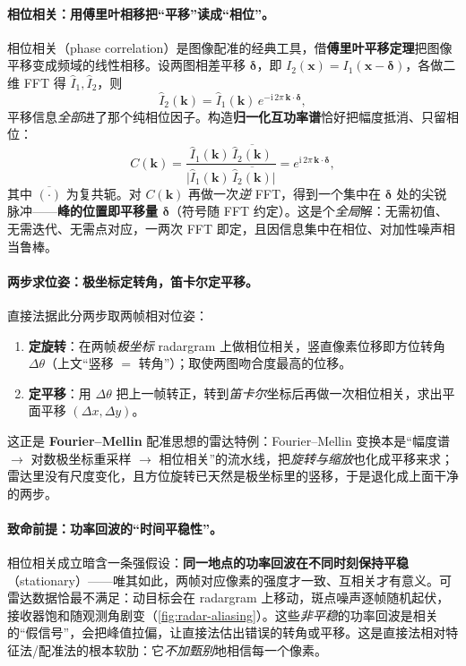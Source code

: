 \paragraph{相位相关：用傅里叶相移把“平移”读成“相位”。}
相位相关（phase correlation）是图像配准的经典工具，借\textbf{傅里叶平移定理}把图像平移变成频域的线性相移。设两图相差平移 $\boldsymbol\delta$，即 $I_2(\mathbf x)=I_1(\mathbf x-\boldsymbol\delta)$，各做二维 FFT 得 $\hat I_1,\hat I_2$，则
\begin{equation}
  \hat I_2(\mathbf k)=\hat I_1(\mathbf k)\,e^{-\mathrm{i}\,2\pi\,\mathbf k\cdot\boldsymbol\delta},
  \label{eq:radar-phasecorr-shift}
\end{equation}
平移信息\emph{全部}进了那个纯相位因子。构造\textbf{归一化互功率谱}恰好把幅度抵消、只留相位：
\begin{equation}
  C(\mathbf k)=\frac{\hat I_1(\mathbf k)\,\overline{\hat I_2(\mathbf k)}}{\bigl|\hat I_1(\mathbf k)\,\overline{\hat I_2(\mathbf k)}\bigr|}
   =e^{\mathrm{i}\,2\pi\,\mathbf k\cdot\boldsymbol\delta},
  \label{eq:radar-phasecorr-cps}
\end{equation}
其中 $\overline{(\cdot)}$ 为复共轭。对 $C(\mathbf k)$ 再做一次\emph{逆} FFT，得到一个集中在 $\boldsymbol\delta$ 处的尖锐脉冲——\textbf{峰的位置即平移量 $\boldsymbol\delta$}（符号随 FFT 约定）。这是个\emph{全局}解：无需初值、无需迭代、无需点对应，一两次 FFT 即定，且因信息集中在相位、对加性噪声相当鲁棒。

\paragraph{两步求位姿：极坐标定转角，笛卡尔定平移。}
直接法据此分两步取两帧相对位姿\cite{carlone2026handbook}：
\begin{enumerate}
  \item \textbf{定旋转}：在两帧\emph{极坐标} radargram 上做相位相关，竖直像素位移即方位转角 $\Delta\theta$（上文“竖移 $=$ 转角”）；取使两图吻合度最高的位移。
  \item \textbf{定平移}：用 $\Delta\theta$ 把上一帧转正，转到\emph{笛卡尔}坐标后再做一次相位相关，求出平面平移 $(\Delta x,\Delta y)$。
\end{enumerate}
这正是 \textbf{Fourier--Mellin} 配准思想的雷达特例：Fourier--Mellin 变换本是“幅度谱 $\to$ 对数极坐标重采样 $\to$ 相位相关”的流水线，把\emph{旋转与缩放}也化成平移来求；雷达里没有尺度变化，且方位旋转已天然是极坐标里的竖移，于是退化成上面干净的两步。

\paragraph{致命前提：功率回波的“时间平稳性”。}
相位相关成立暗含一条强假设：\textbf{同一地点的功率回波在不同时刻保持平稳}（stationary）——唯其如此，两帧对应像素的强度才一致、互相关才有意义\cite{carlone2026handbook}。可雷达数据恰最不满足：动目标会在 radargram 上移动，斑点噪声逐帧随机起伏，接收器饱和随观测角剧变（\cref{fig:radar-aliasing}）。这些\emph{非平稳}的功率回波是相关的“假信号”，会把峰值拉偏，让直接法估出错误的转角或平移。这是直接法相对特征法/配准法的根本软肋：它\emph{不加甄别}地相信每一个像素。

